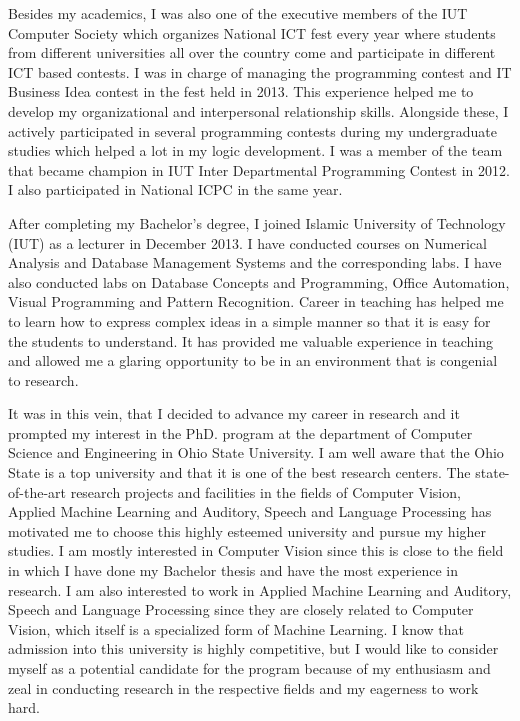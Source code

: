 \documentclass[12pt]{article}
\newcommand{\w}{2mm}
\begin{document}
\vspace{\w}

Besides my academics, I was also one of the executive members of the IUT Computer Society which organizes National ICT fest every year where students from different universities all over the country come and participate in different ICT based contests. I was in charge of managing the programming contest and IT Business Idea contest in the fest held in 2013. This experience helped me to develop my organizational and interpersonal relationship skills. Alongside these, I actively participated in several programming contests during my undergraduate studies which helped a lot in my logic development. I was a member of the team that became champion in IUT Inter Departmental Programming Contest in 2012. I also participated in National ICPC in the same year.

\vspace{\w}

After completing my Bachelor's degree, I joined Islamic University of Technology (IUT) as a lecturer in December 2013. I have conducted courses on Numerical Analysis and Database Management Systems and the corresponding labs. I have also conducted labs on Database Concepts and Programming, Office Automation, Visual Programming and Pattern Recognition. Career in teaching has helped me to learn how to express complex ideas in a simple manner so that it is easy for the students to understand. It has provided me valuable experience in teaching and allowed me a glaring opportunity to be in an environment that is congenial to research.  

\vspace{\w}

It was in this vein, that I decided to advance my career in research and it prompted my interest in the PhD. program at the department of Computer Science and Engineering in Ohio State University. I am well aware that the Ohio State is a top university and that it is one of the best research centers. The state-of-the-art research projects and facilities in the fields of Computer Vision, Applied Machine Learning and Auditory, Speech and Language Processing has motivated me to choose this highly esteemed university and pursue my higher studies. I am mostly interested in Computer Vision since this is close to the field in which I have done my Bachelor thesis and have the most experience in research. I am also interested to work in Applied Machine Learning and Auditory, Speech and Language Processing since they are closely related to Computer Vision, which itself is a specialized form of Machine Learning. I know that admission into this university is highly competitive, but I would like to consider myself as a potential candidate for the program because of my enthusiasm and zeal in conducting research in the respective fields and my eagerness to work hard.
\end{document}
